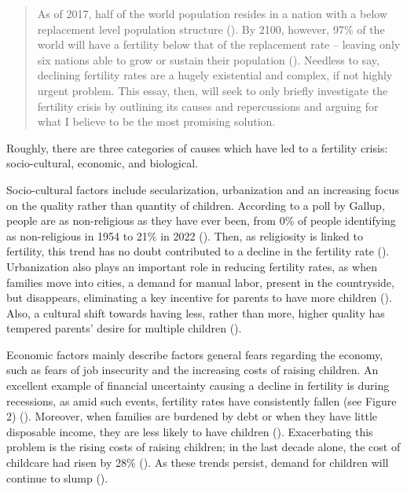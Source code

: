 \documentclass[12pt, a4paper, twoside]{article}
\begin{document}
\maketitle{}

\begin{abstract}
As of 2017, half of the world population resides in a nation with a below replacement level population structure (\cite{frejka2017half}). By 2100, however, 97\% of the world will have a fertility below that of the replacement rate – leaving only six nations able to grow or sustain their population (\cite{thelancet2024dramatic}). Needless to say, declining fertility rates are a hugely existential and complex, if not highly urgent problem. This essay, then, will seek to only briefly investigate the fertility crisis by outlining its causes and repercussions and arguing for what I believe to be the most promising solution. 
\end{abstract}

Roughly, there are three categories of causes which have led to a fertility crisis: socio-cultural, economic, and biological.  

Socio-cultural factors include secularization, urbanization and an increasing focus on the quality rather than quantity of children. According to a poll by Gallup, people are as non-religious as they have ever been, from 0\% of people identifying as non-religious in 1954 to 21\% in 2022 (\cite{newport2022slowdown}). Then, as religiosity is linked to fertility, this trend has no doubt contributed to a decline in the fertility rate (\cite[p.\ 85]{kearney2023causes}). Urbanization also plays an important role in reducing fertility rates, as when families move into cities, a demand for manual labor, present in the countryside, but  disappears, eliminating a key incentive for parents to have more children (\cite{bricker2021birthrates}). Also, a cultural shift towards having less, rather than more, higher quality has tempered parents’ desire for multiple children (\cite[p.\ 84]{kearney2023causes}).  

Economic factors mainly describe factors general fears regarding the economy, such as fears of job insecurity and the increasing costs of raising children. An excellent example of financial uncertainty causing a decline in fertility is during recessions, as amid such events, fertility rates have consistently fallen (see Figure 2) (\cite[p.\ 83]{kearney2023causes}). Moreover, when families are burdened by debt or when they have little disposable income, they are less likely to have children (\cite[pp.\ 82, 84]{kearney2023causes}). Exacerbating this problem is the rising costs of raising children; in the last decade alone, the cost of childcare had risen by 28\% (\cite{usafacts2022childcare}). As these trends persist, demand for children will continue to slump (\cites{becker1960economic}{lino2017cost}). 
\end{document}
